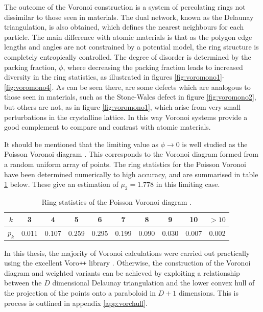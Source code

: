 The outcome of the Voronoi construction is a system of percolating rings not dissimilar to those seen in materials.
The dual network, known as the Delaunay triangulation, is also obtained, which defines the nearest neighbours for each particle.
The main difference with atomic materials is that as the polygon edge lengths and angles are not constrained by a potential model, the ring structure is  completely entropically controlled.
The degree of disorder is determined by the packing fraction, $\phi$, where decreasing the packing fraction leads to increased diversity in the ring statistics, as illustrated in figures \ref{fig:voromono1}\--\ref{fig:voromono4}.
As can be seen there, are some defects which are analogous to those seen in materials, such as the Stone\--Wales defect in figure \ref{fig:voromono2}, but others are not, as in figure \ref{fig:voromono1}, which arise from very small perturbations in the crystalline lattice.
In this way Voronoi systems provide a good complement to compare and contrast with atomic materials.

It should be mentioned that the limiting value as $\phi\rightarrow 0$ is well studied as the Poisson Voronoi diagram \cite{Boots1983,Tanemura2003}.
This corresponds to the Voronoi diagram formed from a random uniform array of points.
The ring statistics for the Poisson Voronoi have been determined numerically to high accuracy, and are summarised in table \ref{tab:pvpk} below.
These give an estimation of $\mu_2=1.778$ in this limiting case. 

\begin{table}[h]
\centering
\caption{Ring statistics of the Poisson Voronoi diagram \cite{Tanemura2003}.}
\label{tab:pvpk}
\begin{tabular}{cccccccccc}
\toprule
$k$ & 3 & 4 & 5 & 6 & 7 & 8 & 9 & 10 & $>10$ \\
\midrule
$p_k$ & 0.011 & 0.107 & 0.259 & 0.295 & 0.199 & 0.090 & 0.030 & 0.007 & 0.002 \\
\bottomrule
\end{tabular}
\end{table}

In this thesis, the majority of Voronoi calculations were carried out practically using the excellent Voro\texttt{++} library \cite{Rycroft2009}.
Otherwise, the construction of the Voronoi diagram and weighted variants can be achieved by exploiting a relationship between the $D$ dimensional Delaunay triangulation and the lower convex hull of the projection of the points onto a paraboloid in $D+1$ dimensions.
This is process is outlined in appendix \ref{app:vorchull}.

